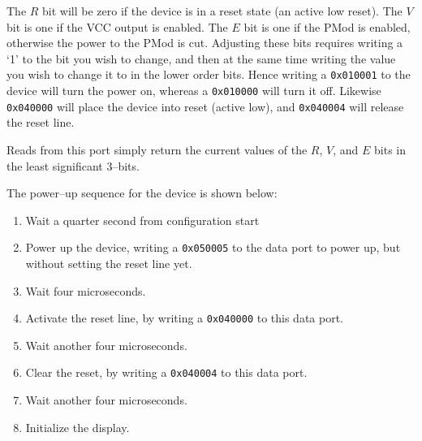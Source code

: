 \documentclass{gqtekspec}
\begin{document}
The $R$ bit will be zero if the device is in a reset state (an active low
reset).  The $V$ bit is one if the VCC output is enabled.  The $E$ bit is one
if the PMod is enabled, otherwise the power to the PMod is cut.  Adjusting
these bits requires writing a `1' to the bit you wish to change, and then
at the same time writing the value you wish to change it to in the lower order
bits.  Hence writing a {\tt 0x010001} to the device will turn the power on,
whereas a {\tt 0x010000} will turn it off.  Likewise {\tt 0x040000} will place
the device into reset (active low), and {\tt 0x040004} will release the reset
line.  

Reads from this port simply return the current values of the $R$, $V$, and
$E$ bits in the least significant 3--bits.

The power--up sequence for the device is shown below:
\begin{enumerate}
\item Wait a quarter second from configuration start
\item Power up the device, writing a {\tt 0x050005} to the data port to
	power up, but without setting the reset line yet.
\item Wait four microseconds.
\item Activate the reset line, by writing a {\tt 0x040000} to this data port.
\item Wait another four microseconds.
\item Clear the reset, by writing a {\tt 0x040004} to this data port.
\item Wait another four microseconds.
\item Initialize the display.
\end{enumerate}
\end{document}
